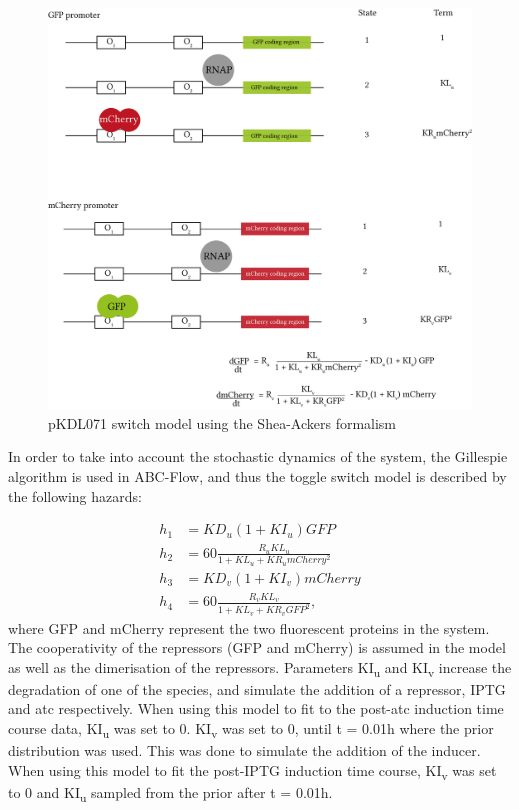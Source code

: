 \begin{figure}[tb]
\centerfloat
	\includegraphics[width=\textwidth]{../../chapters/chapterABCFlow/images/shea-ackers_flow.png}
	\caption[pKDL071 switch model using the Shea-Ackers formalism]{\label{fig:shea-flow}pKDL071 switch model using the Shea-Ackers formalism}
\end{figure}



In order to take into account the stochastic dynamics of the system, the Gillespie algorithm is used in ABC-Flow, and thus the toggle switch model is described by the following hazards:

\begin{align}
h_1 &= KD_u  (1 + KI_u)  GFP\\
h_2 &= 60  \frac{R_u KL_u}{1 + KL_u + KR_u  mCherry^2}\\
h_3 &= KD_v  (1 + KI_v)  mCherry\\
h_4 &= 60  \frac{R_v  KL_v}{1+ KL_v + KR_v  GFP^2},
\end{align}    
\noindent where GFP and mCherry represent the two fluorescent proteins in the system. The cooperativity of the repressors (GFP and mCherry) is assumed in the model as well as the dimerisation of the repressors. Parameters KI\textsubscript{u} and KI\textsubscript{v} increase the degradation of one of the species, and simulate the addition of a repressor, IPTG and \acrshort{atc} respectively. When using this model to fit to the post-\acrshort{atc} induction time course data, KI\textsubscript{u} was set to 0. KI\textsubscript{v} was set to 0, until t = 0.01h where the prior distribution was used. This was done to simulate the addition of the inducer. When using this model to fit the post-IPTG induction time course, KI\textsubscript{v} was set to 0 and KI\textsubscript{u} sampled from the prior after t = 0.01h. 

